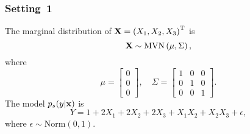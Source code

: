 \documentclass[12pt]{article}
\def\X{{\bf X}}
\def\x{{\bf x}}
\def\trans{^{\rm T}}
\begin{document}
\subsubsection*{Setting~1}

The marginal distribution of $\X=\left(X_1,X_2,X_3\right)\trans$ is
\[
\X\sim\mathrm{MVN}\left(\mu,\Sigma\right),
\]
where
\[
\mu=\begin{bmatrix}
	0\\
	0\\
	0
\end{bmatrix},\quad
\Sigma=\begin{bmatrix}
	1 & 0 & 0\\
	0 & 1 & 0\\
	0 & 0 & 1
\end{bmatrix}.
\]
The model $p_s(y|\x)$ is
\[
Y=1+2X_1+2X_2+2X_3+X_1X_2+X_2X_3+\epsilon,
\]
where $\epsilon\sim\mathrm{Norm}(0,1)$.

\newpage


\end{document}
